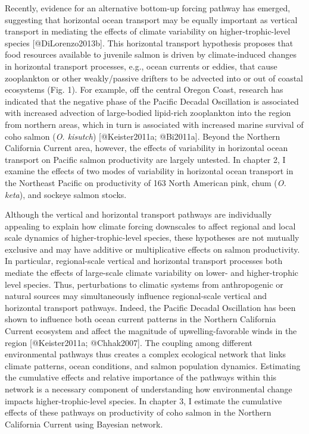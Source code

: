 Recently, evidence for an alternative bottom-up forcing pathway has
emerged, suggesting that horizontal ocean transport may be equally
important as vertical transport in mediating the effects of climate
variability on higher-trophic-level species {[}@DiLorenzo2013b{]}. This
horizontal transport hypothesis proposes that food resources available
to juvenile salmon is driven by climate-induced changes in horizontal
transport processes, e.g., ocean currents or eddies, that cause
zooplankton or other weakly/passive drifters to be advected into or out
of coastal ecosystems (Fig. 1). For example, off the central Oregon
Coast, research has indicated that the negative phase of the Pacific
Decadal Oscillation is associated with increased advection of
large-bodied lipid-rich zooplankton into the region from northern areas,
which in turn is associated with increased marine survival of coho
salmon (\emph{O. kisutch}) {[}@Keister2011a; @Bi2011a{]}. Beyond the
Northern California Current area, however, the effects of variability in
horizontal ocean transport on Pacific salmon productivity are largely
untested. In chapter 2, I examine the effects of two modes of
variability in horizontal ocean transport in the Northeast Pacific on
productivity of 163 North American pink, chum (\emph{O. keta}), and
sockeye salmon stocks.

Although the vertical and horizontal transport pathways are individually
appealing to explain how climate forcing downscales to affect regional
and local scale dynamics of higher-trophic-level species, these
hypotheses are not mutually exclusive and may have additive or
multiplicative effects on salmon productivity. In particular,
regional-scale vertical and horizontal transport processes both mediate
the effects of large-scale climate variability on lower- and
higher-trophic level species. Thus, perturbations to climatic systems
from anthropogenic or natural sources may simultaneously influence
regional-scale vertical and horizontal transport pathways. Indeed, the
Pacific Decadal Oscillation has been shown to influence both ocean
current patterns in the Northern California Current ecosystem and affect
the magnitude of upwelling-favorable winds in the region
{[}@Keister2011a; @Chhak2007{]}. The coupling among different
environmental pathways thus creates a complex ecological network that
links climate patterns, ocean conditions, and salmon population
dynamics. Estimating the cumulative effects and relative importance of
the pathways within this network is a necessary component of
understanding how environmental change impacts higher-trophic-level
species. In chapter 3, I estimate the cumulative effects of these
pathways on productivity of coho salmon in the Northern California
Current using Bayesian network.

